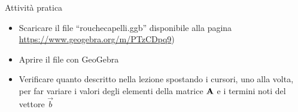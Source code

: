 \documentclass{beamer}
\begin{document}
\generatitolo

\begin{frame}{Attivit\`a pratica}

    \begin{itemize}
    
     \item Scaricare il file ``rouchecapelli.ggb''
     disponibile alla pagina
     \url{https://www.geogebra.org/m/PTzCDpq9})
     
     \item Aprire il file con \alert{GeoGebra}
     
     \item Verificare quanto descritto nella lezione spostando i cursori, uno alla volta, per far variare i valori degli elementi
     della matrice $\mathbf{A}$ e i termini noti del vettore $\vec{b}$

    \end{itemize}
\end{frame}
\end{document}

